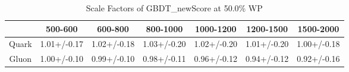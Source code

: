 \begin{table}
\centering
\caption{Scale Factors of GBDT_newScore at 50.0\% WP}
\label{tab:GBDT_newScore_0.5_Gluon}
\begin{tabular}{ccccccc}
\toprule
{} &      500-600 &      600-800 &     800-1000 &    1000-1200 &    1200-1500 &    1500-2000 \\
\midrule
Quark &  1.01+/-0.17 &  1.02+/-0.18 &  1.03+/-0.20 &  1.02+/-0.20 &  1.01+/-0.20 &  1.00+/-0.18 \\
Gluon &  1.00+/-0.10 &  0.99+/-0.10 &  0.98+/-0.11 &  0.96+/-0.12 &  0.94+/-0.12 &  0.92+/-0.16 \\
\bottomrule
\end{tabular}
\end{table}
